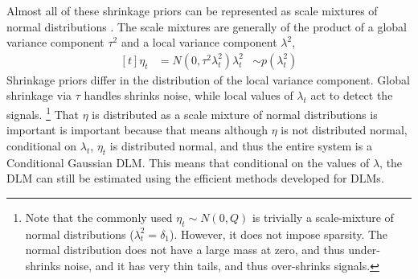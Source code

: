 \documentclass{article}
\begin{document}
Almost all of these shrinkage priors can be represented as scale mixtures of normal distributions \parencite{PolsonScott2010}.
The scale mixtures are generally of the product of a global variance component $\tau^{2}$ and a local variance component $\lambda^{2}$,
\begin{equation}
  \label{eq:3}
  \begin{aligned}[t]
    \eta_{t} &= N(0, \tau^{2} \lambda_{t}^{2})
    \lambda_{t}^{2} &\sim p(\lambda_{t}^{2})
  \end{aligned}
\end{equation}
Shrinkage priors differ in the distribution of the local variance component.%
Global shrinkage via $\tau$ handles shrinks noise, while local values of $\lambda_{t}$ act to detect the signals.\parencite[5]{PolsonScott2010}
\footnote{
Note that the commonly used $\eta_{t} \sim N(0, Q)$ is trivially a scale-mixture of normal distributions ($\lambda_{t}^{2} = \delta_{1}$).
However, it does not impose sparsity. 
The normal distribution does not have a large mass at zero, and thus under-shrinks noise, and it has very thin tails, and thus over-shrinks signals.
}
That $\eta$ is distributed as a scale mixture of normal distributions is important is important because that means although $\eta$ is not distributed normal, conditional on $\lambda_{t}$, $\eta_{t}$ is distributed normal, and thus the entire system is a Conditional Gaussian DLM.
This means that conditional on the values of $\lambda$, the DLM can still be estimated using the efficient methods developed for DLMs.
\end{document}
